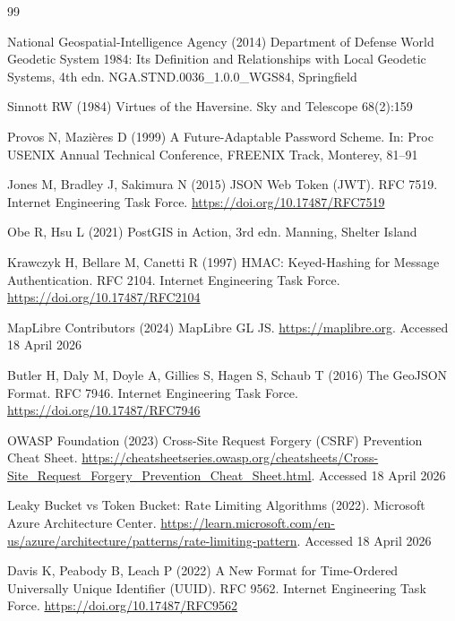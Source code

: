 \documentclass[12pt,a4paper]{article}
\theoremstyle{definition}
\theoremstyle{plain}
\theoremstyle{remark}
\begin{document}
\begin{thebibliography}{99}

National Geospatial-Intelligence Agency (2014)
Department of Defense World Geodetic System 1984: Its Definition and
Relationships with Local Geodetic Systems, 4th edn.
NGA.STND.0036\_1.0.0\_WGS84, Springfield

Sinnott RW (1984) Virtues of the Haversine.
Sky and Telescope 68(2):159

Provos N, Mazières D (1999) A Future-Adaptable Password Scheme.
In: Proc USENIX Annual Technical Conference, FREENIX Track, Monterey, 81--91

Jones M, Bradley J, Sakimura N (2015) JSON Web Token (JWT).
RFC 7519. Internet Engineering Task Force.
\url{https://doi.org/10.17487/RFC7519}

Obe R, Hsu L (2021) PostGIS in Action, 3rd edn.
Manning, Shelter Island

Krawczyk H, Bellare M, Canetti R (1997) HMAC: Keyed-Hashing for Message
Authentication. RFC 2104. Internet Engineering Task Force.
\url{https://doi.org/10.17487/RFC2104}

MapLibre Contributors (2024) MapLibre GL JS.
\url{https://maplibre.org}. Accessed 18 April 2026

Butler H, Daly M, Doyle A, Gillies S, Hagen S, Schaub T (2016)
The GeoJSON Format. RFC 7946. Internet Engineering Task Force.
\url{https://doi.org/10.17487/RFC7946}

OWASP Foundation (2023) Cross-Site Request Forgery (CSRF) Prevention
Cheat Sheet. \url{https://cheatsheetseries.owasp.org/cheatsheets/Cross-Site\_Request\_Forgery\_Prevention\_Cheat\_Sheet.html}. Accessed 18 April 2026

Leaky Bucket vs Token Bucket: Rate Limiting Algorithms (2022).
Microsoft Azure Architecture Center.
\url{https://learn.microsoft.com/en-us/azure/architecture/patterns/rate-limiting-pattern}.
Accessed 18 April 2026

Davis K, Peabody B, Leach P (2022) A New Format for Time-Ordered
Universally Unique Identifier (UUID). RFC 9562.
Internet Engineering Task Force.
\url{https://doi.org/10.17487/RFC9562}

\end{thebibliography}
\end{document}
